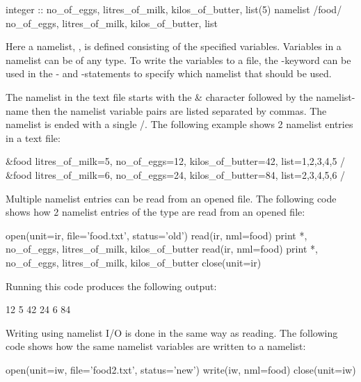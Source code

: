 \begin{fortrancodeenv}
integer :: no_of_eggs, litres_of_milk, kilos_of_butter, list(5)
namelist /food/ no_of_eggs, litres_of_milk, kilos_of_butter, list
\end{fortrancodeenv}

Here a namelist, , is defined consisting of the specified variables. Variables in a namelist can be of any type. To write the variables to a file, the -keyword can be used in the - and -statements to specify which namelist that should be used.

The namelist in the text file starts with the \& character followed by the namelist-name then the namelist variable pairs are listed separated by commas. The namelist is ended with a single /. The following example shows 2 namelist entries in a text file:

\begin{fortrancodeenv}
&food litres_of_milk=5, no_of_eggs=12, kilos_of_butter=42, list=1,2,3,4,5 /
&food litres_of_milk=6, no_of_eggs=24, kilos_of_butter=84, list=2,3,4,5,6 /
\end{fortrancodeenv}

Multiple namelist entries can be read from an opened file. The following code shows how 2 namelist entries of the type  are read from an opened file:

\begin{fortrancodeenv}
open(unit=ir, file='food.txt', status='old')
read(ir, nml=food)
print *, no_of_eggs, litres_of_milk, kilos_of_butter
read(ir, nml=food)
print *, no_of_eggs, litres_of_milk, kilos_of_butter
close(unit=ir)
\end{fortrancodeenv}

Running this code produces the following output:

\cmdmode

\begin{fortrancodeenv}
          12           5          42
          24           6          84
\end{fortrancodeenv}

\fmode

Writing using namelist I/O is done in the same way as reading. The following code shows how the same namelist variables are written to a namelist:

\begin{fortrancodeenv}
open(unit=iw, file='food2.txt', status='new')
write(iw, nml=food)
close(unit=iw)
\end{fortrancodeenv}

